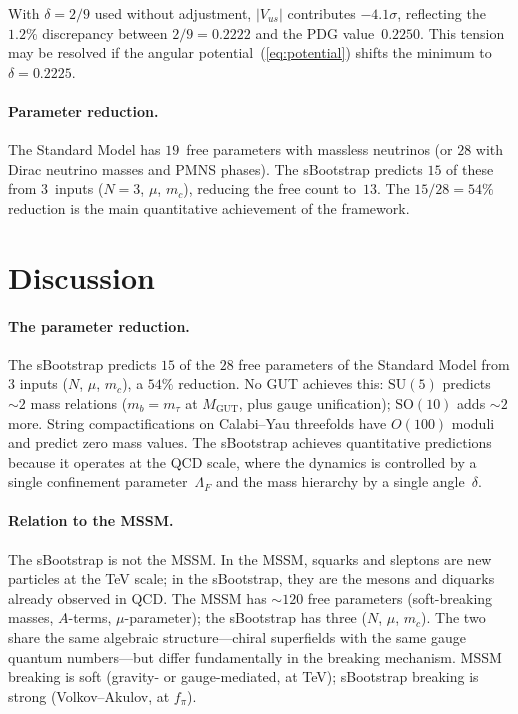 \documentclass[aps,prd,twocolumn,showpacs,preprintnumbers,superscriptaddress]{revtex4-2}
\newcommand{\SU}{\mathrm{SU}}
\newcommand{\SO}{\mathrm{SO}}
\begin{document}
With $\delta = 2/9$ used without adjustment, $|V_{us}|$
contributes $-4.1\sigma$, reflecting the $1.2\%$ discrepancy
between $2/9 = 0.2222$ and the PDG value~$0.2250$.
This tension may be resolved if the angular
potential~(\ref{eq:potential}) shifts the minimum to
$\delta = 0.2225$.

\paragraph{Parameter reduction.}

The Standard Model has $19$~free parameters with massless
neutrinos (or $28$ with Dirac neutrino masses and PMNS
phases).  The sBootstrap predicts $15$ of these from
$3$~inputs ($N = 3$, $\mu$, $m_c$), reducing the free count
to~$13$.  The $15/28 = 54\%$ reduction is the main
quantitative achievement of the framework.

\section{Discussion}
\label{sec:discussion}

\paragraph{The parameter reduction.}

The sBootstrap predicts $15$ of the $28$ free parameters of
the Standard Model from $3$ inputs ($N$, $\mu$, $m_c$),
a $54\%$ reduction.
No GUT achieves this: $\SU(5)$ predicts $\sim 2$ mass
relations ($m_b = m_\tau$ at $M_{\mathrm{GUT}}$, plus gauge
unification); $\SO(10)$ adds $\sim 2$ more.
String compactifications on Calabi--Yau threefolds have
$O(100)$ moduli and predict zero mass values.
The sBootstrap achieves quantitative predictions because
it operates at the QCD scale, where the dynamics is
controlled by a single confinement parameter~$\Lambda_F$
and the mass hierarchy by a single angle~$\delta$.

\paragraph{Relation to the MSSM.}

The sBootstrap is not the MSSM.
In the MSSM, squarks and sleptons are new particles at the
TeV scale; in the sBootstrap, they are the mesons and diquarks
already observed in QCD.
The MSSM has $\sim 120$ free parameters (soft-breaking masses,
$A$-terms, $\mu$-parameter); the sBootstrap has three
($N$, $\mu$, $m_c$).
The two share the same algebraic structure---chiral superfields
with the same gauge quantum numbers---but differ fundamentally
in the breaking mechanism.
MSSM breaking is soft (gravity- or gauge-mediated, at TeV);
sBootstrap breaking is strong (Volkov--Akulov, at $f_\pi$).
\end{document}
